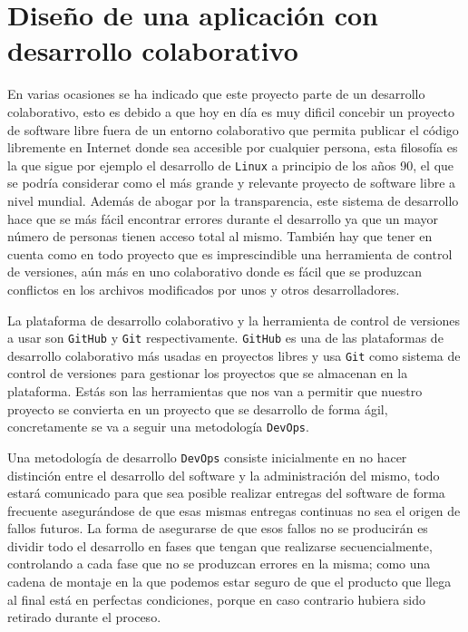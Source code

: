 \newpage
\section{Diseño de una aplicación con desarrollo colaborativo}

En varias ocasiones se ha indicado que este proyecto parte de un desarrollo colaborativo, esto es debido a que hoy en día es muy
dificil concebir un proyecto de software libre fuera de un entorno colaborativo que permita publicar el código libremente en
Internet donde sea accesible por cualquier persona, esta filosofía es la que sigue por ejemplo el desarrollo de {\tt Linux}
a principio de los años 90, el que se podría considerar como el más grande y relevante proyecto de software libre a nivel 
mundial. Además de abogar por la transparencia, este sistema de desarrollo hace que se más fácil encontrar errores durante el 
desarrollo ya que un mayor número de personas tienen acceso total al mismo. También hay que tener en cuenta como en todo 
proyecto que es imprescindible una herramienta de control de versiones, aún más en uno colaborativo donde es fácil que se 
produzcan conflictos en los archivos modificados por unos y otros desarrolladores.

\bigskip
La plataforma de desarrollo colaborativo y la herramienta de control de versiones a usar son {\tt GitHub} y {\tt Git} 
respectivamente. {\tt GitHub} es una de las plataformas de desarrollo colaborativo más usadas en proyectos libres y usa 
{\tt Git} como sistema de control de versiones para gestionar los proyectos que se almacenan en la plataforma. Estás son las 
herramientas que nos van a permitir que nuestro proyecto se convierta en un proyecto que se desarrollo de forma ágil, 
concretamente se va a seguir una metodología {\tt DevOps}.

\bigskip
Una metodología de desarrollo {\tt DevOps} consiste inicialmente en no hacer distinción entre el desarrollo del software y la
administración del mismo, todo estará comunicado para que sea posible realizar entregas del software de forma frecuente 
asegurándose de que esas mismas entregas continuas no sea el origen de fallos futuros. La forma de asegurarse de que esos
fallos no se producirán es dividir todo el desarrollo en fases que tengan que realizarse secuencialmente, controlando a cada
fase que no se produzcan errores en la misma; como una cadena de montaje en la que podemos estar seguro de que el producto
que llega al final está en perfectas condiciones, porque en caso contrario hubiera sido retirado durante el proceso.

